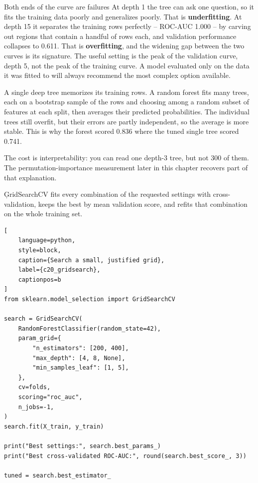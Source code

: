 \begin{ExplainBox}{Both ends of the curve are failures}
At depth 1 the tree can ask one question, so it fits the training data poorly
and generalizes poorly. That is \textbf{underfitting}. At depth 15 it separates
the training rows perfectly -- ROC-AUC 1.000 -- by carving out regions that
contain a handful of rows each, and validation performance collapses to 0.611.
That is \textbf{overfitting}, and the widening gap between the two curves is its
signature. The useful setting is the peak of the validation curve, depth 5, not
the peak of the training curve. A model evaluated only on the data it was fitted
to will always recommend the most complex option available.
\end{ExplainBox}


A single deep tree memorizes its training rows. A random forest fits many trees,
each on a bootstrap sample of the rows and choosing among a random subset of
features at each split, then averages their predicted probabilities. The
individual trees still overfit, but their errors are partly independent, so the
average is more stable. This is why the forest scored 0.836 where the tuned
single tree scored 0.741.

The cost is interpretability: you can read one depth-3 tree, but not 300 of them.
The permutation-importance measurement later in this chapter recovers part of
that explanation.


\c{GridSearchCV} fits every combination of the requested settings with
cross-validation, keeps the best by mean validation score, and refits that
combination on the whole training set.

\begin{lstlisting}[
    language=python,
    style=block,
    caption={Search a small, justified grid},
    label={c20_gridsearch},
    captionpos=b
]
from sklearn.model_selection import GridSearchCV

search = GridSearchCV(
    RandomForestClassifier(random_state=42),
    param_grid={
        "n_estimators": [200, 400],
        "max_depth": [4, 8, None],
        "min_samples_leaf": [1, 5],
    },
    cv=folds,
    scoring="roc_auc",
    n_jobs=-1,
)
search.fit(X_train, y_train)

print("Best settings:", search.best_params_)
print("Best cross-validated ROC-AUC:", round(search.best_score_, 3))

tuned = search.best_estimator_
\end{lstlisting}

